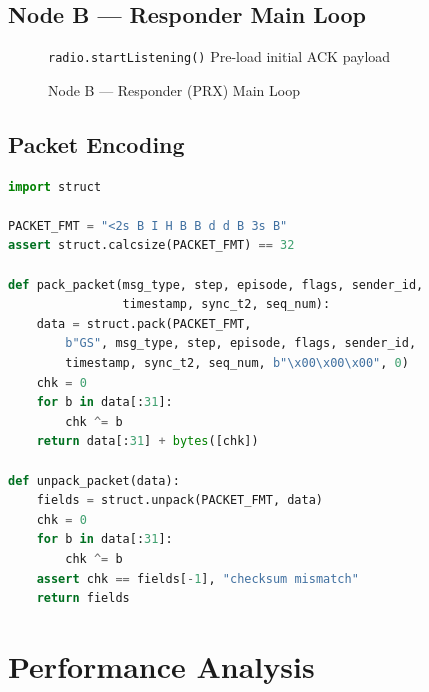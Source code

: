 \documentclass[11pt,a4paper]{article}
\begin{document}
\subsection{Node B --- Responder Main Loop}

\begin{figure}[htbp]
\begin{algorithm}[H]
\SetAlgoLined
{}
\texttt{radio.startListening()}\;
Pre-load initial ACK payload\;
\caption{Node B --- Responder (PRX) Main Loop}
\label{alg:node-b}
\end{algorithm}
\end{figure}

\subsection{Packet Encoding}

\begin{lstlisting}[language=Python]
import struct

PACKET_FMT = "<2s B I H B B d d B 3s B"
assert struct.calcsize(PACKET_FMT) == 32

def pack_packet(msg_type, step, episode, flags, sender_id,
                timestamp, sync_t2, seq_num):
    data = struct.pack(PACKET_FMT,
        b"GS", msg_type, step, episode, flags, sender_id,
        timestamp, sync_t2, seq_num, b"\x00\x00\x00", 0)
    chk = 0
    for b in data[:31]:
        chk ^= b
    return data[:31] + bytes([chk])

def unpack_packet(data):
    fields = struct.unpack(PACKET_FMT, data)
    chk = 0
    for b in data[:31]:
        chk ^= b
    assert chk == fields[-1], "checksum mismatch"
    return fields
\end{lstlisting}


\section{Performance Analysis}
\end{document}
